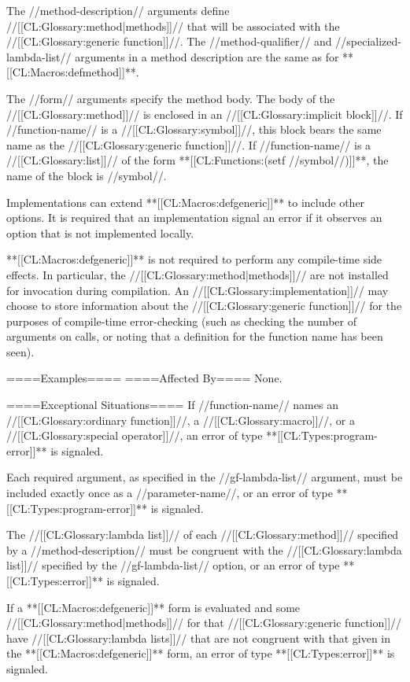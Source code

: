 \endlist

The //method-description// arguments define //[[CL:Glossary:method|methods]]// that will be associated with the //[[CL:Glossary:generic function]]//. The //method-qualifier// and //specialized-lambda-list// arguments in a method description are the same as for **[[CL:Macros:defmethod]]**.

The //form// arguments specify the method body. The body of the //[[CL:Glossary:method]]// is enclosed in an //[[CL:Glossary:implicit block]]//. If //function-name// is a //[[CL:Glossary:symbol]]//, this block bears the same name as the //[[CL:Glossary:generic function]]//. If //function-name// is a //[[CL:Glossary:list]]// of the form **[[CL:Functions:(setf //symbol//)]]**, the name of the block is //symbol//.

Implementations can extend **[[CL:Macros:defgeneric]]** to include other options. It is required that an implementation signal an error if it observes an option that is not implemented locally.

**[[CL:Macros:defgeneric]]** is not required to perform any compile-time side effects. In particular, the //[[CL:Glossary:method|methods]]// are not installed for invocation during compilation. An //[[CL:Glossary:implementation]]// may choose to store information about the //[[CL:Glossary:generic function]]// for the purposes of compile-time error-checking (such as checking the number of arguments on calls, or noting that a definition for the function name has been seen).

====Examples====
====Affected By====
None.

====Exceptional Situations====
If //function-name// names an //[[CL:Glossary:ordinary function]]//, a //[[CL:Glossary:macro]]//, or a //[[CL:Glossary:special operator]]//, an error of type **[[CL:Types:program-error]]** is signaled.

Each required argument, as specified in the //gf-lambda-list// argument, must be included exactly once as a //parameter-name//, or an error of type **[[CL:Types:program-error]]** is signaled.

The //[[CL:Glossary:lambda list]]// of each //[[CL:Glossary:method]]// specified by a //method-description// must be congruent with the //[[CL:Glossary:lambda list]]// specified by the //gf-lambda-list// option, or an error of type **[[CL:Types:error]]** is signaled.

If a **[[CL:Macros:defgeneric]]** form is evaluated and some //[[CL:Glossary:method|methods]]// for that //[[CL:Glossary:generic function]]// have //[[CL:Glossary:lambda lists]]// that are not congruent with that given in the **[[CL:Macros:defgeneric]]** form, an error of type **[[CL:Types:error]]** is signaled.

